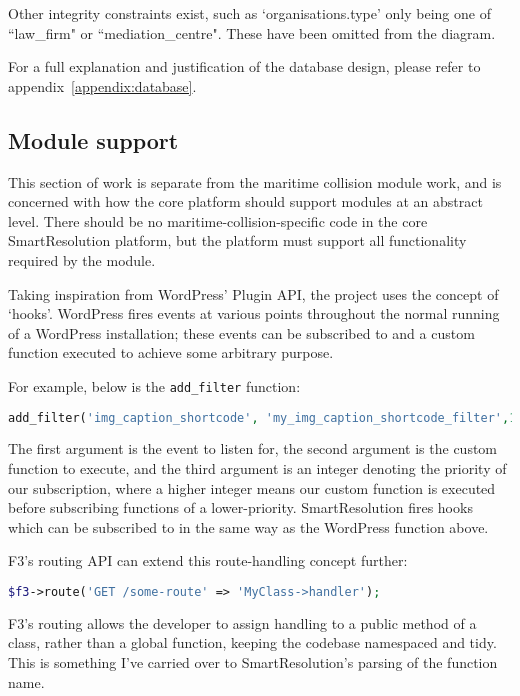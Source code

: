 Other integrity constraints exist, such as `organisations.type' only being one of ``law\_firm" or ``mediation\_centre". These have been omitted from the diagram.

For a full explanation and justification of the database design, please refer to appendix~\ref{appendix:database}.

\subsection{Module support}

This section of work is separate from the maritime collision module work, and is concerned with how the core platform should support modules at an abstract level. There should be no maritime-collision-specific code in the core SmartResolution platform, but the platform must support all functionality required by the module.

Taking inspiration from WordPress' Plugin API, the project uses the concept of `hooks'. WordPress fires events at various points throughout the normal running of a WordPress installation; these events can be subscribed to and a custom function executed to achieve some arbitrary purpose.

For example, below is the \lstinline{add_filter} function:

\begin{lstlisting}[language=php]
add_filter('img_caption_shortcode', 'my_img_caption_shortcode_filter',10);
\end{lstlisting}

The first argument is the event to listen for, the second argument is the custom function to execute, and the third argument is an integer denoting the priority of our subscription, where a higher integer means our custom function is executed before subscribing functions of a lower-priority. SmartResolution fires hooks which can be subscribed to in the same way as the WordPress function above.

F3's routing API can extend this route-handling concept further:

\begin{lstlisting}[language=php]
$f3->route('GET /some-route' => 'MyClass->handler');
\end{lstlisting}

F3's routing allows the developer to assign handling to a public method of a class, rather than a global function, keeping the codebase namespaced and tidy. This is something I've carried over to SmartResolution's parsing of the function name.

